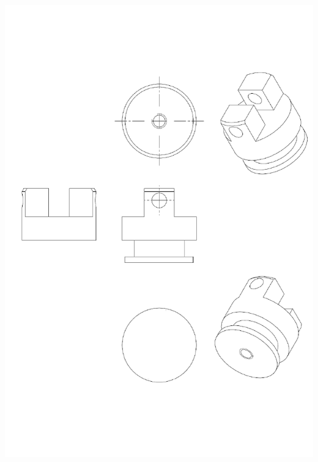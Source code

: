 \documentclass[11pt,oneside]{article}
\begin{document}
\begin{center}
\includegraphics[height=\textheight]{png/fig12}
\end{center}
\end{document}
